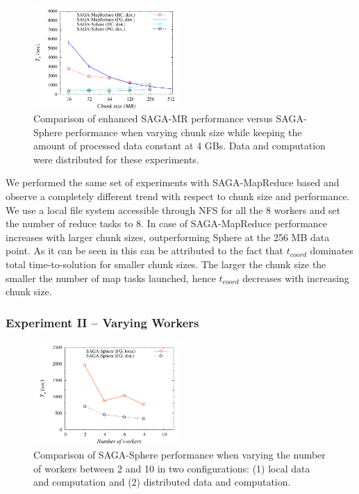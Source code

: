 \documentclass[3p,twocolumn]{elsarticle}
\begin{document}
\begin{figure}[htb!]
 \upp \upp
 \includegraphics[width=0.5\textwidth]{figures/sphere_mr_varying_chunksize.pdf}
 \upp \upp
 \caption{
   Comparison of enhanced SAGA-MR performance versus
   SAGA-Sphere performance when varying chunk size while keeping the amount
   of processed data constant at 4 GBs. Data and computation were
   distributed for these experiments.
   \label{fig:sphere_mr_chunksize}
   }
\end{figure}

We performed the same set of experiments with SAGA-MapReduce based
\wc and observe a completely different trend with respect to
chunk size and performance. We use a local file system accessible
through NFS for all the 8 workers and set the number of reduce tasks
to 8.  In case of SAGA-MapReduce performance increases with larger
chunk sizes, outperforming Sphere at the 256 MB data point. As it can
be seen in  this can be attributed to the fact that
$t_{coord}$ dominates total time-to-solution for smaller chunk sizes.
The larger the chunk size the smaller the number of map tasks
launched, hence $t_{coord}$ decreases with increasing chunk size.


\subsubsection{Experiment II -- Varying Workers}

\begin{figure}[htb!]
 \includegraphics[width=0.5\textwidth]{figures/sphere_varying_workers.pdf}
 \caption{
   Comparison of SAGA-Sphere performance when varying the number of workers
   between 2 and 10 in two configurations: (1) local data and computation
   and (2) distributed data and computation.
   \label{fig:sphere_varying_workers}
   }
\end{figure}
\end{document}
